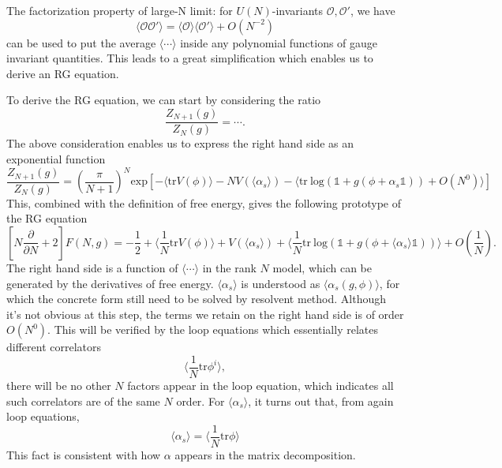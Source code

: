The factorization property of large-N limit: for $U(N)$-invariants $\mathcal{O},\mathcal{O}'$, we have
\begin{equation}
    \langle \mathcal{O}\mathcal{O}' \rangle = \langle \mathcal{O} \rangle \langle \mathcal{O}' \rangle + O(N^{-2})
\end{equation}
can be used to put the average $\langle \cdots \rangle$ inside any polynomial functions of gauge invariant quantities. This leads to a great simplification which enables us to derive an RG equation.

To derive the RG equation, we can start by considering the ratio
\[\frac{Z_{N+1}(g)}{Z_N(g)} = \cdots.\]
The above consideration enables us to express the right hand side as an exponential function
\[\frac{Z_{N+1}(g)}{Z_N(g)} = \left(\frac{\pi}{N+1}\right)^N \mathrm{exp}[-\langle \mathrm{tr}V(\phi)\rangle - N V(\langle \alpha_s \rangle) - \langle \mathrm{tr}~\mathrm{log}(\mathds{1}+g(\phi+\alpha_s \mathds{1})) + O(N^0)\rangle]\]
This, combined with the definition of free energy, gives the following prototype of the RG equation
\begin{equation}
    \left[N\frac{\partial}{\partial N} + 2\right] F(N,g) = -\frac{1}{2} + \langle \frac{1}{N}\mathrm{tr}V(\phi)\rangle + V(\langle \alpha_s\rangle) + \langle \frac{1}{N} \mathrm{tr}~\mathrm{log}(\mathds{1}+g(\phi+\langle \alpha_s\rangle\mathds{1}))\rangle + O(\frac{1}{N}).
\end{equation}
The right hand side is a function of $\langle \cdots \rangle$ in the rank $N$ model, which can be generated by the derivatives of free energy. $\langle \alpha_s \rangle$ is understood as $\langle \alpha_s (g,\phi)\rangle$, for which the concrete form still need to be solved by resolvent method. Although it's not obvious at this step, the terms we retain on the right hand side is of order $O(N^0)$. This will be verified by the loop equations which essentially relates different correlators
\[\langle \frac{1}{N} \mathrm{tr} \phi^i \rangle,\]
there will be no other $N$ factors appear in the loop equation, which indicates all such correlators are of the same $N$ order. For $\langle \alpha_s \rangle$, it turns out that, from again loop equations,
\[\langle \alpha_s \rangle = \langle \frac{1}{N}\mathrm{tr}\phi \rangle\]
This fact is consistent with how $\alpha$ appears in the matrix decomposition.

